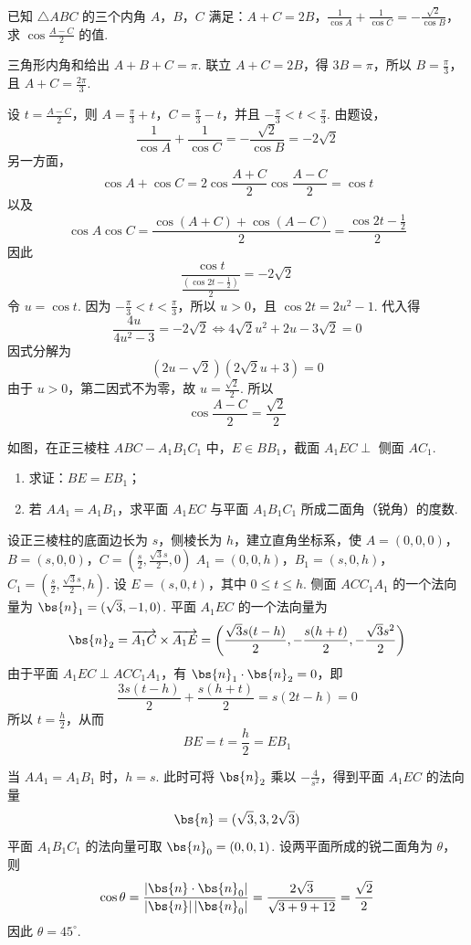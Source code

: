 \documentclass[UTF8,a4paper,oneside,11pt]{ctexbook}
\begin{document}
\begin{problem}
已知 \(\triangle ABC\) 的三个内角 \(A\)，\(B\)，\(C\) 满足：\(A + C = 2B\)，\(\frac{1}{\cos A} + \frac{1}{\cos C} = -\frac{\sqrt{2}}{\cos B}\)，求 \(\cos \frac{A - C}{2}\) 的值.
\end{problem}

\begin{solution}
三角形内角和给出 \(A+B+C=\pi\). 联立 \(A+C=2B\)，得 \(3B=\pi\)，所以 \(B=\frac{\pi}{3}\)，且 \(A+C=\frac{2\pi}{3}\).

设 \(t=\frac{A-C}{2}\)，则 \(A=\frac{\pi}{3}+t\)，\(C=\frac{\pi}{3}-t\)，并且 \(-\frac{\pi}{3}<t<\frac{\pi}{3}\). 由题设，
\[
\frac1{\cos A}+\frac1{\cos C}
=-\frac{\sqrt2}{\cos B}
=-2\sqrt2
\]
另一方面，
\[
\cos A+\cos C
=2\cos\frac{A+C}{2}\cos\frac{A-C}{2}
=\cos t
\]
以及
\[
\cos A\cos C
=\frac{\cos(A+C)+\cos(A-C)}2
=\frac{\cos2t-\frac12}{2}
\]
因此
\[
\frac{\cos t}{\frac{(\cos2t-\frac12)}{2}}=-2\sqrt2
\]
令 \(u=\cos t\). 因为 \(-\frac{\pi}{3}<t<\frac{\pi}{3}\)，所以 \(u>0\)，且 \(\cos2t=2u^2-1\). 代入得
\[
\frac{4u}{4u^2-3}=-2\sqrt2
\Longleftrightarrow
4\sqrt2u^2+2u-3\sqrt2=0
\]
因式分解为
\[
(2u-\sqrt2)(2\sqrt2u+3)=0
\]
由于 \(u>0\)，第二因式不为零，故 \(u=\frac{\sqrt2}{2}\). 所以
\[
\cos\frac{A-C}{2}=\frac{\sqrt2}{2}
\]
\end{solution}

\begin{problem}
如图，在正三棱柱 \(ABC-A_{1}B_{1}C_{1}\) 中，\(E \in BB_{1}\)，截面 \(A_{1}EC \perp\) 侧面 \(AC_{1}\).

\begin{enumerate}
\item 求证：\(BE = EB_{1}\)；
\item 若 \(AA_{1} = A_{1}B_{1}\)，求平面 \(A_{1}EC\) 与平面 \(A_{1}B_{1}C_{1}\) 所成二面角（锐角）的度数.
\end{enumerate}

\FloatBarrier
\end{problem}

\begin{solution}
设正三棱柱的底面边长为 \(s\)，侧棱长为 \(h\)，建立直角坐标系，使
\(A=(0,0,0)\)，\(B=(s,0,0)\)，\(C=\left(\frac s2,\frac{\sqrt3s}{2},0\right)\)
\(A_1=(0,0,h)\)，\(B_1=(s,0,h)\)，\(C_1=\left(\frac s2,\frac{\sqrt3s}{2},h\right)\).
设 \(E=(s,0,t)\)，其中 \(0\leqslant t\leqslant h\). 侧面 \(ACC_1A_1\) 的一个法向量为 \(\bs{n}_1=(\sqrt3,-1,0)\). 平面 \(A_1EC\) 的一个法向量为
\[
\bs{n}_2=\overrightarrow{A_1C}\times\overrightarrow{A_1E}
=\left(\frac{\sqrt3s(t-h)}2,-\frac{s(h+t)}2,-\frac{\sqrt3s^2}2\right)
\]
由于平面 \(A_1EC\perp ACC_1A_1\)，有 \(\bs{n}_1\cdot\bs{n}_2=0\)，即
\[
\frac{3s(t-h)}2+\frac{s(h+t)}2=s(2t-h)=0
\]
所以 \(t=\frac h2\)，从而
\[
BE=t=\frac h2=EB_1
\]

当 \(AA_1=A_1B_1\) 时，\(h=s\). 此时可将 \(\bs{n}_2\) 乘以 \(-\frac4{s^2}\)，得到平面 \(A_1EC\) 的法向量
\[
\bs{n}=(\sqrt3,3,2\sqrt3)
\]
平面 \(A_1B_1C_1\) 的法向量可取 \(\bs{n}_0=(0,0,1)\). 设两平面所成的锐二面角为 \(\theta\)，则
\[
\cos\theta=\frac{|\bs{n}\cdot\bs{n}_0|}{|\bs{n}|\,|\bs{n}_0|}
=\frac{2\sqrt3}{\sqrt{3+9+12}}
=\frac{\sqrt2}{2}
\]
因此 \(\theta=45^{\circ}\).
\end{solution}
\end{document}
